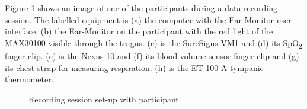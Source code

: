 Figure \ref{fig:TrialPhoto} shows an image of one of the participants during a data recording session. The labelled equipment is (a) the computer with the Ear-Monitor user interface, (b) the Ear-Monitor on the participant with the red light of the MAX30100 visible through the tragus. (c) is the SureSigns VM1 and (d) its SpO\textsubscript{2} finger clip. (e) is the Nexus-10 and (f) its blood volume sensor finger clip and (g) its chest strap for measuring respiration. (h) is the ET 100-A tympanic thermometer.

\begin{figure}[H]
\centering
\graphicspath{{figs/}}

\caption{Recording session set-up with participant}
\label{fig:TrialPhoto}
\end{figure}

